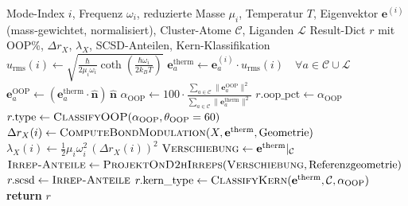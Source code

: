 \documentclass[11pt,a4paper,twoside]{article}
\theoremstyle{remark}
\begin{document}
\begin{algorithm}[H]
\caption{\textsc{AnalyzeMode}}
\begin{algorithmic}[1]
\Require Mode-Index $i$, Frequenz $\omega_i$, reduzierte Masse $\mu_i$,
         Temperatur $T$, Eigenvektor $\mathbf{e}^{(i)}$ (mass-gewichtet,
         normalisiert), Cluster-Atome $\mathcal{C}$,
         Liganden $\mathcal{L}$
\Ensure Result-Dict $r$ mit OOP\%, $\Delta r_X$, $\lambda_X$,
        SCSD-Anteilen, Kern-Klassifikation
\State {}
\State $u_\text{rms}(i) \gets \sqrt{\frac{\hbar}{2\mu_i\omega_i}
       \coth\!\left(\frac{\hbar\omega_i}{2 k_B T}\right)}$
\State $\mathbf{e}^\text{therm}_a \gets \mathbf{e}_a^{(i)} \cdot u_\text{rms}(i)
       \quad \forall a \in \mathcal{C} \cup \mathcal{L}$
\State {}
\State $\mathbf{e}_a^\text{OOP} \gets (\mathbf{e}^\text{therm}_a \cdot
       \hat{\mathbf{n}})\,\hat{\mathbf{n}}$
\State $\alpha_\text{OOP} \gets 100 \cdot
       \frac{\sum_{a\in\mathcal{C}} \|\mathbf{e}_a^\text{OOP}\|^2}
            {\sum_{a\in\mathcal{C}} \|\mathbf{e}^\text{therm}_a\|^2}$
\State $r.\text{oop\_pct} \gets \alpha_\text{OOP}$
\State $r.\text{type} \gets \textsc{ClassifyOOP}(\alpha_\text{OOP},
       \theta_\text{OOP}=60)$
\State {}
  \State $\Delta r_X(i) \gets \textsc{ComputeBondModulation}(X,
         \mathbf{e}^\text{therm}, \text{Geometrie})$
  \State $\lambda_X(i) \gets \tfrac{1}{2}\mu_i \omega_i^2 \,(\Delta r_X(i))^2$
\EndFor
\State {}
  \State $\textsc{Verschiebung} \gets \mathbf{e}^\text{therm}|_\mathcal{C}$
  \State $\textsc{Irrep-Anteile} \gets \textsc{ProjektOnD2hIrreps}(
         \textsc{Verschiebung}, \text{Referenzgeometrie})$
  \State $r.\text{scsd} \gets \textsc{Irrep-Anteile}$
\EndIf
\State {}
\State $r.\text{kern\_type} \gets \textsc{ClassifyKern}(\mathbf{e}^\text{therm},
       \mathcal{C}, \alpha_\text{OOP})$
\State \textbf{return} $r$
\end{algorithmic}
\end{algorithm}
\end{document}
